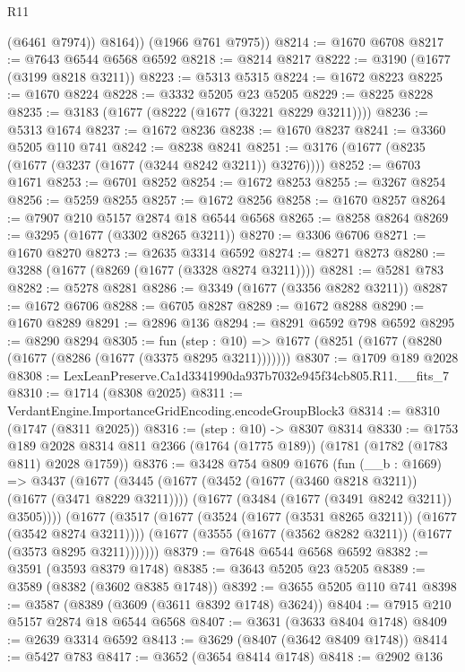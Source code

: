 \begin{lexlean}{R11}
\begin{coremodule}
            (@6461 @7974))
          @8164))
      (@1966 @761 @7975))
@8214 := @1670 @6708
@8217 := @7643 @6544 @6568 @6592
@8218 := @8214 @8217
@8222 := @3190 (@1677 (@3199 @8218 @3211))
@8223 := @5313 @5315
@8224 := @1672 @8223
@8225 := @1670 @8224
@8228 := @3332 @5205 @23 @5205
@8229 := @8225 @8228
@8235 := @3183 (@1677 (@8222 (@1677 (@3221 @8229 @3211))))
@8236 := @5313 @1674
@8237 := @1672 @8236
@8238 := @1670 @8237
@8241 := @3360 @5205 @110 @741
@8242 := @8238 @8241
@8251 := @3176 (@1677 (@8235 (@1677 (@3237 (@1677 (@3244 @8242 @3211)) @3276))))
@8252 := @6703 @1671
@8253 := @6701 @8252
@8254 := @1672 @8253
@8255 := @3267 @8254
@8256 := @5259 @8255
@8257 := @1672 @8256
@8258 := @1670 @8257
@8264 := @7907 @210 @5157 @2874 @18 @6544 @6568
@8265 := @8258 @8264
@8269 := @3295 (@1677 (@3302 @8265 @3211))
@8270 := @3306 @6706
@8271 := @1670 @8270
@8273 := @2635 @3314 @6592
@8274 := @8271 @8273
@8280 := @3288 (@1677 (@8269 (@1677 (@3328 @8274 @3211))))
@8281 := @5281 @783
@8282 := @5278 @8281
@8286 := @3349 (@1677 (@3356 @8282 @3211))
@8287 := @1672 @6706
@8288 := @6705 @8287
@8289 := @1672 @8288
@8290 := @1670 @8289
@8291 := @2896 @136
@8294 := @8291 @6592 @798 @6592
@8295 := @8290 @8294
@8305 := fun (step : @10) =>
  @1677 (@8251 (@1677 (@8280 (@1677 (@8286 (@1677 (@3375 @8295 @3211)))))))
@8307 := @1709 @189 @2028
@8308 := LexLeanPreserve.Ca1d3341990da937b7032e945f34cb805.R11.__fits_7
@8310 := @1714 (@8308 @2025)
@8311 := VerdantEngine.ImportanceGridEncoding.encodeGroupBlock3
@8314 := @8310 (@1747 (@8311 @2025))
@8316 := (step : @10) -> @8307 @8314
@8330 := @1753
    @189
    @2028
    @8314
    @811
    @2366
    (@1764 (@1775 @189))
    (@1781 (@1782 (@1783 @811) @2028 @1759))
@8376 := @3428
    @754
    @809
    @1676
    (fun (__b : @1669) =>
    @3437
      (@1677
        (@3445
          (@1677 (@3452 (@1677 (@3460 @8218 @3211)) (@1677 (@3471 @8229 @3211))))
          (@1677 (@3484 (@1677 (@3491 @8242 @3211)) @3505))))
      (@1677
        (@3517
          (@1677 (@3524 (@1677 (@3531 @8265 @3211)) (@1677 (@3542 @8274 @3211))))
          (@1677 (@3555 (@1677 (@3562 @8282 @3211)) (@1677 (@3573 @8295 @3211)))))))
@8379 := @7648 @6544 @6568 @6592
@8382 := @3591 (@3593 @8379 @1748)
@8385 := @3643 @5205 @23 @5205
@8389 := @3589 (@8382 (@3602 @8385 @1748))
@8392 := @3655 @5205 @110 @741
@8398 := @3587 (@8389 (@3609 (@3611 @8392 @1748) @3624))
@8404 := @7915 @210 @5157 @2874 @18 @6544 @6568
@8407 := @3631 (@3633 @8404 @1748)
@8409 := @2639 @3314 @6592
@8413 := @3629 (@8407 (@3642 @8409 @1748))
@8414 := @5427 @783
@8417 := @3652 (@3654 @8414 @1748)
@8418 := @2902 @136

\end{coremodule}
\end{lexlean}
